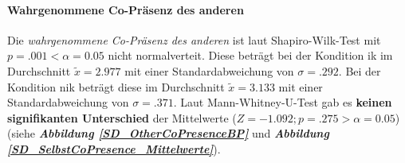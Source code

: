 \documentclass[a4paper,11pt]{article}%
\renewcommand{\\}{\vspace*{0.5\baselineskip} \newline}
\begin{document}
\paragraph{Wahrgenommene Co-Präsenz des anderen}
Die \textit{wahrgenommene Co-Präsenz des anderen} ist laut Shapiro-Wilk-Test mit $p = .001 < \alpha = 0.05$ nicht normalverteit.
Diese beträgt bei der Kondition \ac{ik} im Durchschnitt $\tilde x = 2.977$ mit einer Standardabweichung von $\sigma = .292$.
Bei der Kondition \ac{nik} beträgt diese im Durchschnitt $\tilde x =3.133$ mit einer Standardabweichung von $\sigma =.371$. 
Laut Mann-Whitney-U-Test gab es \textbf{keinen signifikanten Unterschied} der Mittelwerte ($ Z = -1.092; p = .275 > \alpha = 0.05$) (siehe \textbf{\textit{Abbildung \ref{SD_OtherCoPresenceBP}}} und \textbf{\textit{Abbildung \ref{SD_SelbstCoPresence_Mittelwerte}}}).
\end{document}
